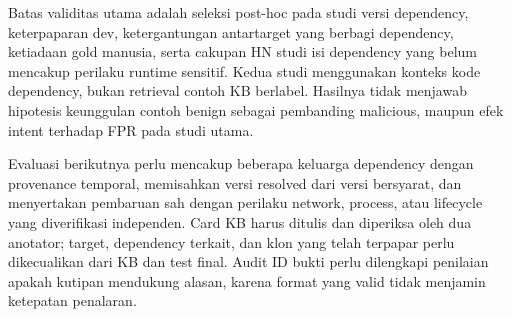 Batas validitas utama adalah seleksi post-hoc pada studi versi dependency,
keterpaparan dev, ketergantungan antartarget yang berbagi dependency,
ketiadaan gold manusia, serta cakupan HN studi isi dependency yang belum
mencakup perilaku runtime sensitif.
Kedua studi menggunakan konteks kode dependency, bukan retrieval contoh KB
berlabel. Hasilnya tidak menjawab hipotesis keunggulan contoh benign sebagai
pembanding malicious, maupun efek intent terhadap FPR pada studi utama.

Evaluasi berikutnya perlu mencakup beberapa keluarga dependency dengan
provenance temporal, memisahkan versi resolved dari versi bersyarat, dan
menyertakan pembaruan sah dengan perilaku network, process, atau lifecycle
yang diverifikasi independen. Card KB harus ditulis dan diperiksa oleh dua
anotator; target, dependency terkait, dan klon yang telah terpapar perlu
dikecualikan dari KB dan test final. Audit ID bukti perlu dilengkapi penilaian
apakah kutipan mendukung alasan, karena format yang valid tidak menjamin
ketepatan penalaran.
